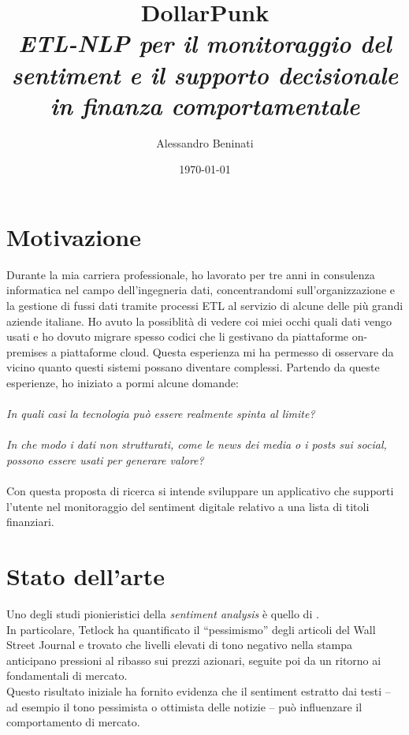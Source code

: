 \documentclass[a4paper,12pt]{article}
\title{%
  \textbf{DollarPunk}\\[1em]
  {\large \textit{ETL-NLP per il monitoraggio del sentiment e il supporto decisionale in finanza comportamentale}}%
}
\author{Alessandro Beninati}
\date{\today}
\begin{document}
\maketitle
\newpage
\section{Motivazione}
 Durante la mia carriera professionale, ho lavorato per tre anni in consulenza informatica
 nel campo dell’ingegneria dati, concentrandomi sull’organizzazione e la gestione di fussi
 dati tramite processi ETL al servizio di alcune delle più grandi aziende italiane. Ho avuto
 la possiblità di vedere coi miei occhi quali dati vengo usati e ho dovuto migrare spesso
 codici che li gestivano da piattaforme on-premises a piattaforme cloud.
 Questa esperienza mi ha permesso di osservare da vicino quanto questi sistemi possano diventare complessi.
Partendo da queste esperienze, ho iniziato a pormi alcune domande: \\\\\textit{In quali casi la tecnologia può essere realmente spinta al limite? }\\\\\textit{In che modo i dati non strutturati, come le news dei media o i posts sui social, possono essere usati per generare valore? }
 \\
\\Con questa proposta di ricerca si intende sviluppare un applicativo che supporti l’utente nel monitoraggio del sentiment digitale relativo a una lista di titoli finanziari.  
\section{Stato dell'arte}
Uno degli studi pionieristici della \textit{sentiment analysis} è quello di \textcite{tetlock2007giving}.\\
In particolare, Tetlock ha quantificato il “pessimismo” degli articoli del Wall Street Journal e trovato che livelli elevati di tono negativo nella stampa anticipano pressioni al ribasso sui prezzi azionari, seguite poi da un ritorno ai fondamentali di mercato.\\
Questo risultato iniziale ha fornito evidenza che il sentiment estratto dai testi – ad esempio il tono pessimista o ottimista delle notizie –  può influenzare il comportamento di mercato.
\end{document}
